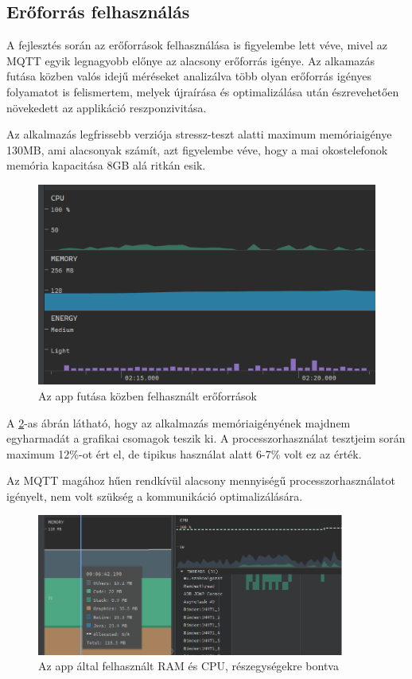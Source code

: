 \documentclass[
]{thesis-ekf}
\theoremstyle{definition}
\theoremstyle{remark}
\begin{document}
\subsection{Erőforrás felhasználás}
A fejlesztés során az erőforrások felhasználása is figyelembe lett véve, mivel az MQTT egyik legnagyobb előnye
az alacsony erőforrás igénye. Az alkamazás futása közben valós idejű méréseket analizálva több olyan
erőforrás igényes folyamatot is felismertem, melyek újraírása és optimalizálása után észrevehetően növekedett
az applikáció reszponzivitása.

Az alkalmazás legfrissebb verziója stressz-teszt alatti maximum memóriaigénye 130MB, ami alacsonyak számít, azt
figyelembe véve, hogy a mai okostelefonok memória kapacitása 8GB alá ritkán esik.
\begin{figure}[h]
	\centering
	\label{profiler}
	\includegraphics{images/profiler.png}
	\caption{Az app futása közben felhasznált erőforrások}
\end{figure}

A \ref{usage}-as ábrán látható, hogy az alkalmazás memóriaigényének majdnem egyharmadát a grafikai csomagok teszik ki.
A processzorhasználat tesztjeim során maximum 12\%-ot ért el, de tipikus használat alatt 6-7\% volt ez az érték.

Az MQTT magához hűen rendkívül alacsony mennyiségű processzorhasználatot igényelt, nem volt szükség a kommunikáció
optimalizálására.
\begin{figure}
	\centering
	\includegraphics[width=0.9\textwidth]{images/profiler_ram_cpu.png}
	\caption{Az app által felhasznált RAM és CPU, részegységekre bontva}
	\label{usage}
\end{figure}
\end{document}
